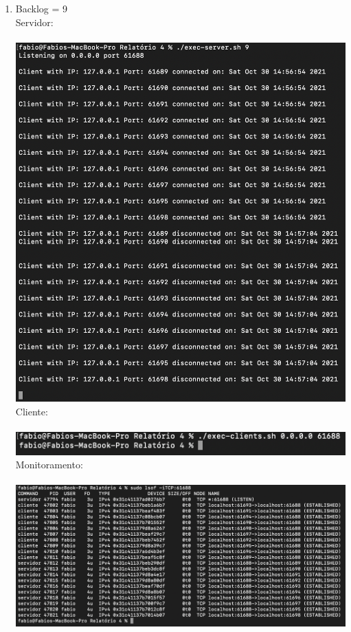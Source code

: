 \documentclass[12pt,a4paper]{report}
\begin{document}
\begin{enumerate}
\begin{enumerate}
        \item Backlog = 9\\
        Servidor:\\\\
        \includegraphics[width=1\textwidth]{images/servidor-backlog-9.png}
        Cliente:\\\\
        \includegraphics[width=1\textwidth]{images/cliente-backlog-9.png}
        Monitoramento:\\\\
        \includegraphics[width=1\textwidth]{images/lsof-backlog-9.png}
        

\end{enumerate}
\end{enumerate}
\end{document}
